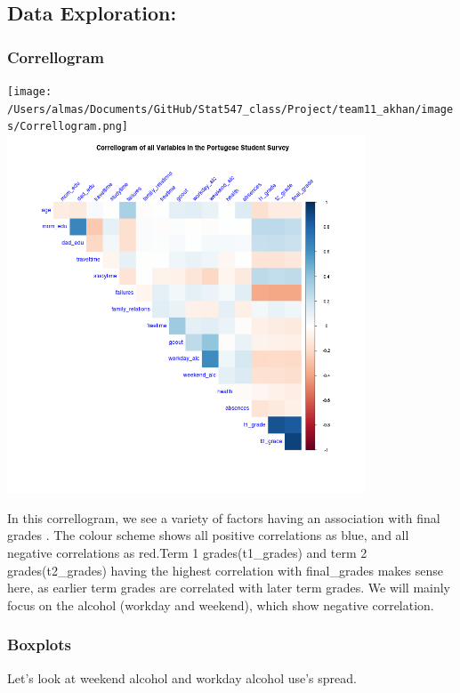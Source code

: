\documentclass[]{article}
\begin{document}
\hypertarget{data-exploration}{%
\subsection{Data Exploration:}\label{data-exploration}}

\hypertarget{correllogram}{%
\subsubsection{Correllogram}\label{correllogram}}

\texttt{[image: /Users/almas/Documents/GitHub/Stat547\_class/Project/team11\_akhan/images/Correllogram.png]}
\includegraphics[width=0.8\textwidth,height=\textheight]{images/Correllogram.png}

In this correllogram, we see a variety of factors having an association
with final grades . The colour scheme shows all positive correlations as
blue, and all negative correlations as red.Term 1 grades(t1\_grades) and
term 2 grades(t2\_grades) having the highest correlation with
final\_grades makes sense here, as earlier term grades are correlated
with later term grades. We will mainly focus on the alcohol (workday and
weekend), which show negative correlation.

\hypertarget{boxplots}{%
\subsubsection{Boxplots}\label{boxplots}}

Let's look at weekend alcohol and workday alcohol use's spread.
\end{document}
